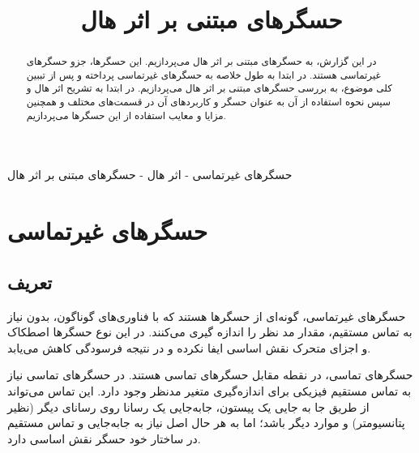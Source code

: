 \documentclass[conference]{IEEEtran-ModifiedForMVIP}
\begin{document}
\IEEEoverridecommandlockouts 

\title{
	حسگرهای مبتنی بر اثر هال 
}

\author{
}







\maketitle

\begin{abstract}
در این گزارش، به حسگرهای مبتنی بر اثر هال می‌پردازیم. این حسگرها، جزو حسگرهای غیرتماسی هستند. در ابتدا به طول خلاصه به حسگر‌های غیرتماسی پرداخته و پس از تببین کلی موضوع، به بررسی حسگر‌های مبتنی بر اثر هال می‌پردازیم. در ابتدا به تشریح اثر هال و سپس نحوه استفاده از آن به عنوان حسگر و کاربردهای آن در قسمت‌های مختلف و همچنین مزایا و معایب استفاده از این حسگرها می‌پردازیم.
 \end{abstract}
\begin{IEEEkeywords}
حسگرهای غیرتماسی - اثر هال - حسگرهای مبتنی بر اثر هال
\end{IEEEkeywords}


\section{حسگرهای غیرتماسی}
\subsection{تعریف}
حسگرهای غیرتماسی، گونه‌ای از حسگرها هستند که با فناوری‌های گوناگون، بدون نیاز به تماس مستقیم، مقدار مد نظر را اندازه گیری‌ می‌کنند. در این نوع حسگر‌ها اصطکاک و اجزای متحرک نقش اساسی ایفا نکرده و در نتیجه فرسودگی کاهش‌ می‌یابد.

حسگرهای تماسی، در نقطه مقابل حسگرهای تماسی هستند. در حسگرهای تماسی نیاز به تماس مستقیم فیزیکی برای اندازه‌گیری متغیر مدنظر وجود دارد. این تماس می‌تواند از طریق جا به جایی یک پیستون، جابه‌جایی یک رسانا روی رسانای دیگر (نظیر پتانسیومتر) و موارد دیگر باشد؛ اما به هر حال اصل نیاز به جا‌به‌جایی و تماس مستقیم در ساختار خود حسگر نقش اساسی دارد.
\cite{varriohm_2020}
 
\end{document}
